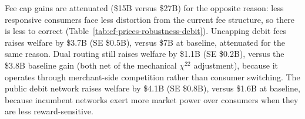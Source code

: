 \documentclass[main.tex]{subfiles}
\begin{document}
Fee cap gains are attenuated (\$15B versus \$27B) for the opposite reason: less responsive consumers face less distortion from the current fee structure, so there is less to correct (Table~\ref{tab:cf-prices-robustness-debit}).
Uncapping debit fees raises welfare by \$3.7B (SE \$0.5B), versus \$7B at baseline, attenuated for the same reason.
Dual routing still raises welfare by \$1.1B (SE \$0.2B), versus the \$3.8B baseline gain (both net of the mechanical $\chi^{22}$ adjustment), because it operates through merchant-side competition rather than consumer switching.
The public debit network raises welfare by \$4.1B (SE \$0.8B), versus \$1.6B at baseline, because incumbent networks exert more market power over consumers when they are less reward-sensitive.

\begin{table}[ht!]
    \caption{Counterfactual effects on prices and shares: Lower reward sensitivity}
    \label{tab:cf-prices-robustness-debit}
    \centering
    \small{
    
    }
\end{table}

\begin{table}[ht!]
    \caption{Counterfactual welfare effects: Lower reward sensitivity}
    \label{tab:welfare-robustness-debit}
    \centering
    \small{
    
    }
\end{table}
\end{document}

